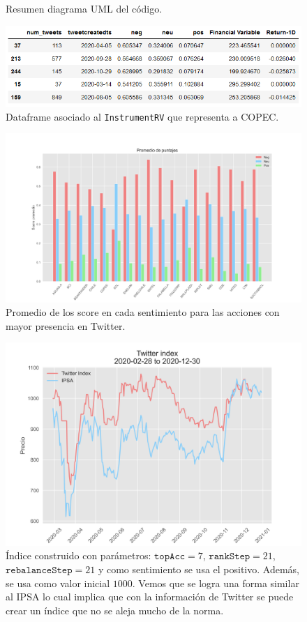\documentclass{article}
\begin{document}
\begin{figure}[H]
	\centering
	
	\caption{Resumen diagrama UML del código.}
	\label{fig:uml}
\end{figure}
\begin{figure}[H]
	\centering
	\includegraphics[scale=.65]{imgs/instrument_sentiment_sample.png}
	\caption{Dataframe asociado al \texttt{InstrumentRV} que representa a COPEC.}
	\label{fig:instrument_sentiment_sample}
\end{figure}
\begin{figure}[H]
	\centering
	\includegraphics[scale=.45]{imgs/mean_score_bar.png}
	\caption{Promedio de los score en cada sentimiento para las acciones con mayor presencia en Twitter.}
	\label{fig:mean_score_bar}
\end{figure}
\begin{figure}[H]
	\centering
	\includegraphics[scale=.55]{imgs/twitter_index.png}
	\caption{Índice construido con parámetros: $\texttt{topAcc}=7$, $\texttt{rankStep}=21$, $\texttt{rebalanceStep}=21$ y como sentimiento se usa el positivo. Además, se usa como valor inicial $1000$. Vemos que se logra una forma similar al IPSA lo cual implica que con la información de Twitter se puede crear un índice que no se aleja mucho de la norma.}
	\label{fig:twitter_index}
\end{figure}
\newpage
%
\end{document}
